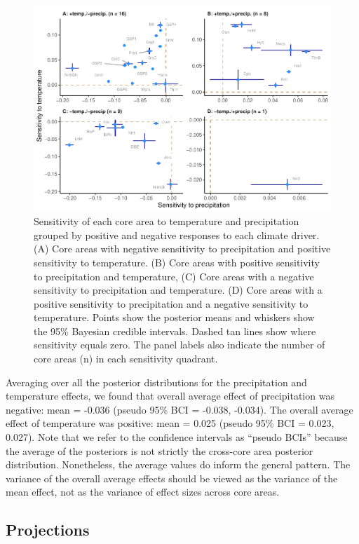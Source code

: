 \documentclass[
  12pt,
]{article}
\begin{document}
\begin{figure}
\centering
\includegraphics{sageCastManuscript_files/figure-latex/sen-scatter-1.pdf}
\caption{\label{fig:sen-scatter}Sensitivity of each core area to temperature and precipitation grouped by positive and negative responses to each climate driver. (A) Core areas with negative sensitivity to precipitation and positive sensitivity to temperature. (B) Core areas with positive sensitivity to precipitation and temperature, (C) Core areas with a negative sensitivity to precipitation and temperature. (D) Core areas with a positive sensitivity to precipitation and a negative sensitivity to temperature. Points show the posterior means and whiskers show the 95\% Bayesian credible intervals. Dashed tan lines show where sensitivity equals zero. The panel labels also indicate the number of core areas (n) in each sensitivity quadrant.}
\end{figure}

Averaging over all the posterior distributions for the precipitation and temperature effects, we found that overall average effect of precipitation was negative: mean = -0.036 (pseudo 95\% BCI = -0.038, -0.034).
The overall average effect of temperature was positive: mean = 0.025 (pseudo 95\% BCI = 0.023, 0.027).
Note that we refer to the confidence intervals as ``pseudo BCIs'' because the average of the posteriors is not strictly the cross-core area posterior distribution.
Nonetheless, the average values do inform the general pattern.
The variance of the overall average effects should be viewed as the variance of the mean effect, not as the variance of effect sizes across core areas.

\hypertarget{projections}{%
\subsection{Projections}\label{projections}}
\end{document}
